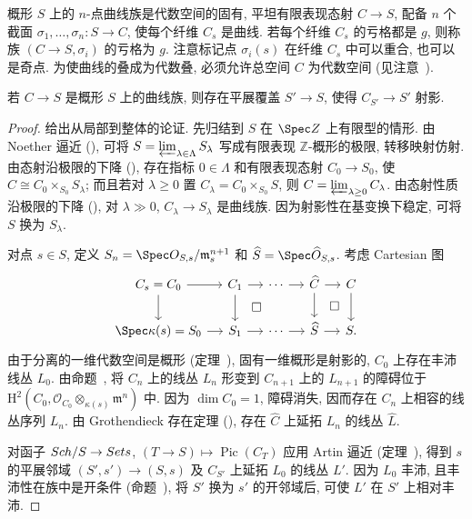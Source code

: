 概形 $S$ 上的 $n$-点曲线族是代数空间的固有, 平坦有限表现态射 $C\to\allowbreak S$, 配备 $n$ 个截面 $\sigma_1,\allowbreak \ldots,\allowbreak \sigma_n:S\to\allowbreak C$, 使每个纤维 $C_s$ 是曲线. 若每个纤维 $C_s$ 的亏格都是 $g$, 则称族 $(C\to\allowbreak S,\allowbreak \sigma_i)$ 的亏格为 $g$. 注意标记点 $\sigma_i(s)$ 在纤维 $C_s$ 中可以重合, 也可以是奇点. 为使曲线的叠成为代数叠, 必须允许总空间 $C$ 为代数空间 (见注意~).
\begin{proposition}\label{src:6.4.1}
若 $C\to\allowbreak S$ 是概形 $S$ 上的曲线族, 则存在平展覆盖 $S'\to\allowbreak S$, 使得 $C_{S'}\to\allowbreak S'$ 射影.
\end{proposition}
\begin{proof}
给出从局部到整体的论证. 先归结到 $S$ 在 $\Spec\mathbb Z$ 上有限型的情形. 由 Noether 逼近 (), 可将 $S=\varprojlim_{\lambda\in\Lambda}S_\lambda$ 写成有限表现 $\mathbb Z$-概形的极限, 转移映射仿射. 由态射沿极限的下降 (), 存在指标 $0\in\Lambda$ 和有限表现态射 $C_0\to\allowbreak S_0$, 使 $C\cong C_0\times_{S_0}S_\lambda$; 而且若对 $\lambda\geq0$ 置 $C_\lambda=C_0\times_{S_0}S$, 则 $C=\varprojlim_{\lambda\geq0}C_\lambda$. 由态射性质沿极限的下降 (), 对 $\lambda\gg0$, $C_\lambda\to\allowbreak S_\lambda$ 是曲线族. 因为射影性在基变换下稳定, 可将 $S$ 换为 $S_\lambda$.

对点 $s\in S$, 定义 $S_n=\Spec\mathcal O_{S,\allowbreak s}/\mathfrak m_s^{n+1}$ 和 $\widehat S=\Spec\widehat{\mathcal O}_{S,\allowbreak s}$. 考虑 Cartesian 图
\[
\begin{tikzcd}[column sep=small]
C_s=C_0\arrow[r]\arrow[d]&C_1\arrow[r]\arrow[d]&\cdots\arrow[r]&\widehat C\arrow[r]\arrow[d]&C\arrow[d]\\
\Spec\kappa(s)=S_0\arrow[r]&S_1\arrow[r]\arrow[ur,phantom,"\square"]&\cdots\arrow[r]&\widehat S\arrow[r]\arrow[ur,phantom,"\square"]&S.
\end{tikzcd}
\]
由于分离的一维代数空间是概形 (定理~), 固有一维概形是射影的, $C_0$ 上存在丰沛线丛 $L_0$. 由命题~, 将 $C_n$ 上的线丛 $L_n$ 形变到 $C_{n+1}$ 上的 $L_{n+1}$ 的障碍位于 $\mathrm H^2(C_0,\allowbreak \mathcal O_{C_0}\otimes_{\kappa(s)}\mathfrak m^n)$ 中. 因为 $\dim C_0=1$, 障碍消失, 因而存在 $C_n$ 上相容的线丛序列 $L_n$. 由 Grothendieck 存在定理 (), 存在 $\widehat C$ 上延拓 $L_n$ 的线丛 $\widehat L$.

对函子 $Sch/S\to Sets$, $(T\to\allowbreak S)\mapsto\operatorname{Pic}(C_T)$ 应用 Artin 逼近 (定理~), 得到 $s$ 的平展邻域 $(S',\allowbreak s')\to(S,\allowbreak s)$ 及 $C_{S'}$ 上延拓 $L_0$ 的线丛 $L'$. 因为 $L_0$ 丰沛, 且丰沛性在族中是开条件 (命题~), 将 $S'$ 换为 $s'$ 的开邻域后, 可使 $L'$ 在 $S'$ 上相对丰沛.
\end{proof}
